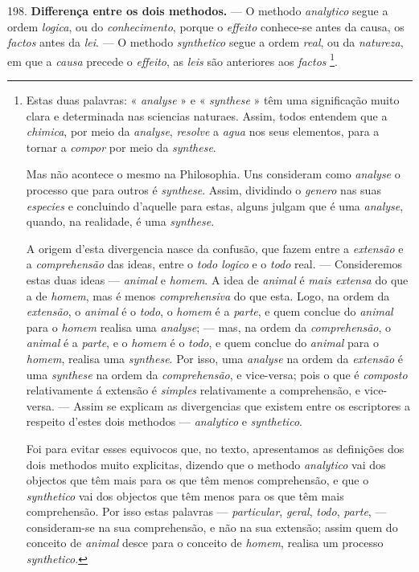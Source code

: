 198. \textbf{Differença entre os dois methodos.} --- O methodo \emph{analytico} segue a ordem \emph{logica}, ou do \emph{conhecimento}, porque o \emph{effeito} conhece-se antes da causa, os \emph{factos} antes da \emph{lei}. --- O methodo \emph{synthetico} segue a ordem \emph{real}, ou da \emph{natureza}, em que a \emph{causa} precede o \emph{effeito}, as \emph{leis} são anteriores aos \emph{factos} \footnote{Estas duas palavras: « \emph{analyse} » e « \emph{synthese} » têm uma significação muito clara e determinada nas sciencias naturaes. Assim, todos entendem que a \emph{chimica}, por meio da \emph{analyse}, \emph{resolve} a \emph{agua} nos seus elementos, para a tornar a \emph{compor} por meio da \emph{synthese}.\par Mas não acontece o mesmo na Philosophia. Uns consideram como \emph{analyse} o processo que para outros é \emph{synthese}. Assim, dividindo o \emph{genero} nas suas \emph{especies} e concluindo d'aquelle para estas, alguns julgam que é uma \emph{analyse}, quando, na realidade, é uma \emph{synthese}.\par A origem d'esta divergencia nasce da confusão, que fazem entre a \emph{extensão} e a \emph{comprehensão} das ideas, entre o \emph{todo logico} e o \emph{todo} real. --- Consideremos estas duas ideas --- \emph{animal} e \emph{homem}. A idea de \emph{animal} é \emph{mais extensa} do que a de \emph{homem}, mas é menos \emph{comprehensiva} do que esta. Logo, na ordem da \emph{extensão}, o \emph{animal} é o \emph{todo}, o \emph{homem} é a \emph{parte}, e quem conclue do \emph{animal} para o \emph{homem} realisa uma \emph{analyse}; --- mas, na ordem da \emph{comprehensão}, o \emph{animal} é a \emph{parte}, e o \emph{homem} é o \emph{todo}, e quem conclue do \emph{animal} para o \emph{homem}, realisa uma \emph{synthese}. Por isso, uma \emph{analyse} na ordem da \emph{extensão} é uma \emph{synthese} na ordem da \emph{comprehensão}, e vice-versa; pois o que é \emph{composto} relativamente á extensão é \emph{simples} relativamente a comprehensão, e vice-versa. --- Assim se explicam as divergencias que existem entre os escriptores a respeito d'estes dois methodos --- \emph{analytico} e \emph{synthetico}.\par Foi para evitar esses equivocos que, no texto, apresentamos as definições dos dois methodos muito explicitas, dizendo que o methodo \emph{analytico} vai dos objectos que têm mais para os que têm menos comprehensão, e que o \emph{synthetico} vai dos objectos que têm menos para os que têm mais comprehensão. Por isso estas palavras --- \emph{particular}, \emph{geral}, \emph{todo}, \emph{parte}, --- consideram-se na sua comprehensão, e não na sua extensão; assim quem do conceito de \emph{animal} desce para o conceito de \emph{homem}, realisa um processo \emph{synthetico}.}.

